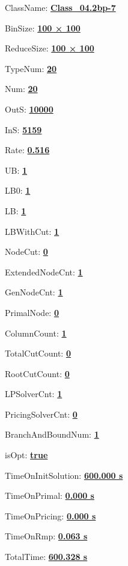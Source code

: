 \documentclass[11pt]{article}
\begin{document}
\pagestyle{empty}


ClassName: \underline{\textbf{Class_04.2bp-7}}
\par
BinSize: \underline{\textbf{100 × 100}}
\par
ReduceSize: \underline{\textbf{100 × 100}}
\par
TypeNum: \underline{\textbf{20}}
\par
Num: \underline{\textbf{20}}
\par
OutS: \underline{\textbf{10000}}
\par
InS: \underline{\textbf{5159}}
\par
Rate: \underline{\textbf{0.516}}
\par
UB: \underline{\textbf{1}}
\par
LB0: \underline{\textbf{1}}
\par
LB: \underline{\textbf{1}}
\par
LBWithCut: \underline{\textbf{1}}
\par
NodeCut: \underline{\textbf{0}}
\par
ExtendedNodeCnt: \underline{\textbf{1}}
\par
GenNodeCnt: \underline{\textbf{1}}
\par
PrimalNode: \underline{\textbf{0}}
\par
ColumnCount: \underline{\textbf{1}}
\par
TotalCutCount: \underline{\textbf{0}}
\par
RootCutCount: \underline{\textbf{0}}
\par
LPSolverCnt: \underline{\textbf{1}}
\par
PricingSolverCnt: \underline{\textbf{0}}
\par
BranchAndBoundNum: \underline{\textbf{1}}
\par
isOpt: \underline{\textbf{true}}
\par
TimeOnInitSolution: \underline{\textbf{600.000 s}}
\par
TimeOnPrimal: \underline{\textbf{0.000 s}}
\par
TimeOnPricing: \underline{\textbf{0.000 s}}
\par
TimeOnRmp: \underline{\textbf{0.063 s}}
\par
TotalTime: \underline{\textbf{600.328 s}}
\par
\newpage
\end{document}

